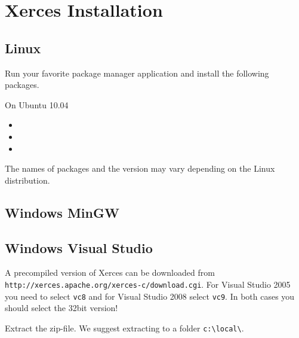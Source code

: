 \section{Xerces Installation}

\subsection{Linux}
Run your favorite package manager application and install the following packages.

On Ubuntu 10.04
\begin{itemize}
\item 
\item 
\item
\end{itemize}
The names of packages and the version may vary depending on the Linux distribution.


\subsection{Windows MinGW}




\subsection{Windows Visual Studio}
A precompiled version of Xerces can be downloaded from \lstinline{http://xerces.apache.org/xerces-c/download.cgi}. For Visual Studio 2005 you need to select \lstinline{vc8} and for Visual Studio 2008 select \lstinline{vc9}. In both cases you should select the 32bit version!

Extract the zip-file. We suggest extracting to a folder \lstinline{c:\local\}.
